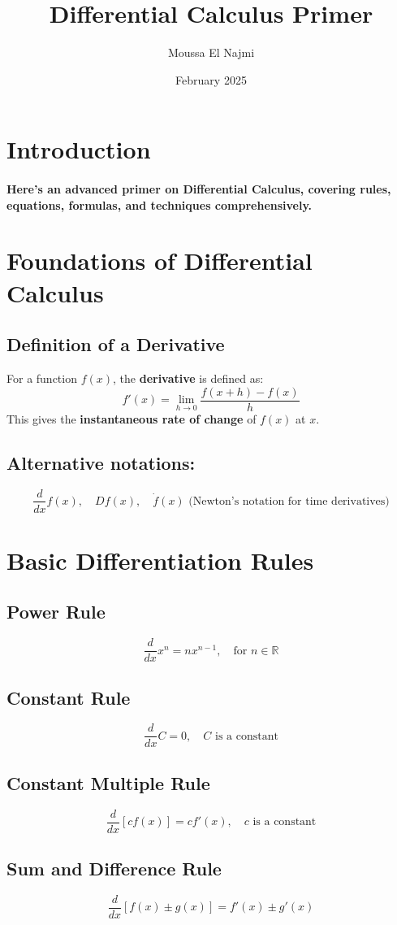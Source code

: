 \documentclass{article}
\title{Differential Calculus Primer}
\author{Moussa El Najmi}
\date{February 2025}
\begin{document}
\maketitle

\section{Introduction}
\paragraph{Here’s an advanced primer on \textbf{Differential Calculus}, covering rules, equations, formulas, and techniques comprehensively.}
\newpage
\section{Foundations of Differential Calculus}
\subsection{Definition of a Derivative}
For a function \( f(x) \), the \textbf{derivative} is defined as:
\[
f'(x) = \lim_{h \to 0} \frac{f(x+h) - f(x)}{h}
\]
This gives the \textbf{instantaneous rate of change} of \( f(x) \) at \( x \).
\subsection{Alternative notations:}
\[
\frac{d}{dx} f(x), \quad Df(x), \quad \dot{f}(x) \text{ (Newton's notation for time derivatives)}
\]
\newpage
\section{Basic Differentiation Rules}
\subsection{Power Rule}
\[
\frac{d}{dx} x^n = n x^{n-1}, \quad \text{for } n \in \mathbb {R}
\]
\subsection{Constant Rule}
\[
\frac{d}{dx} C = 0, \quad C \text{ is a constant}
\]
\subsection{Constant Multiple Rule}
\[
\frac{d}{dx} [c f(x)] = c f'(x), \quad c \text{ is a constant}
\]
\subsection{Sum and Difference Rule}
\[
\frac{d}{dx} [f(x) \pm g(x)] = f'(x) \pm g'(x)
\]
\end{document}
